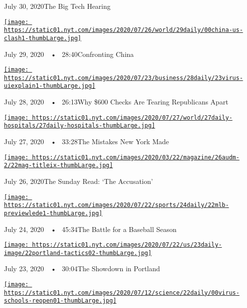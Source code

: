 July 30, 2020The Big Tech Hearing

\href{https://www.nytimes.com/2020/07/29/podcasts/the-daily/china-trump-foreign-policy.html?action=click\&module=audio-series-bar\&region=header\&pgtype=Article}{\texttt{[image: https://static01.nyt.com/images/2020/07/26/world/29daily/00china-us-clash1-thumbLarge.jpg]}}

July 29, 2020~~•~ 28:40Confronting China

\href{https://www.nytimes.com/2020/07/28/podcasts/the-daily/unemployment-benefits-coronavirus.html?action=click\&module=audio-series-bar\&region=header\&pgtype=Article}{\texttt{[image: https://static01.nyt.com/images/2020/07/23/business/28daily/23virus-uiexplain1-thumbLarge.jpg]}}

July 28, 2020~~•~ 26:13Why \$600 Checks Are Tearing Republicans Apart

\href{https://www.nytimes.com/2020/07/27/podcasts/the-daily/new-york-hospitals-covid.html?action=click\&module=audio-series-bar\&region=header\&pgtype=Article}{\texttt{[image: https://static01.nyt.com/images/2020/07/27/world/27daily-hospitals/27daily-hospitals-thumbLarge.jpg]}}

July 27, 2020~~•~ 33:28The Mistakes New York Made

\href{https://www.nytimes.com/2020/07/26/podcasts/the-daily/the-accusation-the-sunday-read.html?action=click\&module=audio-series-bar\&region=header\&pgtype=Article}{\texttt{[image: https://static01.nyt.com/images/2020/03/22/magazine/26audm-2/22mag-titleix-thumbLarge.jpg]}}

July 26, 2020The Sunday Read: `The Accusation'

\href{https://www.nytimes.com/2020/07/24/podcasts/the-daily/mlb-baseball-season-coronavirus.html?action=click\&module=audio-series-bar\&region=header\&pgtype=Article}{\texttt{[image: https://static01.nyt.com/images/2020/07/22/sports/24daily/22mlb-previewlede1-thumbLarge.jpg]}}

July 24, 2020~~•~ 45:34The Battle for a Baseball Season

\href{https://www.nytimes.com/2020/07/23/podcasts/the-daily/portland-protests.html?action=click\&module=audio-series-bar\&region=header\&pgtype=Article}{\texttt{[image: https://static01.nyt.com/images/2020/07/22/us/23daily-image/22portland-tactics02-thumbLarge.jpg]}}

July 23, 2020~~•~ 30:04The Showdown in Portland

\href{https://www.nytimes.com/2020/07/22/podcasts/the-daily/school-reopenings-coronavirus.html?action=click\&module=audio-series-bar\&region=header\&pgtype=Article}{\texttt{[image: https://static01.nyt.com/images/2020/07/12/science/22daily/00virus-schools-reopen01-thumbLarge.jpg]}}

